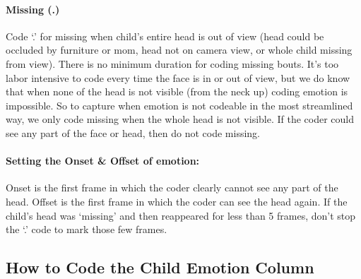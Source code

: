 \documentclass[
]{book}
\begin{document}
\hypertarget{child_head_not_visible}{%
\paragraph*{Missing (.)}\label{child_head_not_visible}}

Code `.' for missing when child's entire head is out of view (head could be occluded by furniture or mom, head not on camera view, or whole child missing from view). There is no minimum duration for coding missing bouts. It's too labor intensive to code every time the face is in or out of view, but we do know that when none of the head is not visible (from the neck up) coding emotion is impossible. So to capture when emotion is not codeable in the most streamlined way, we only code missing when the whole head is not visible. If the coder could see any part of the face or head, then do not code missing.

\hypertarget{setting-the-onset-offset-of-emotion-1}{%
\paragraph{Setting the Onset \& Offset of emotion:}\label{setting-the-onset-offset-of-emotion-1}}

Onset is the first frame in which the coder clearly cannot see any part of the head.
Offset is the first frame in which the coder can see the head again.
If the child's head was `missing' and then reappeared for less than 5 frames, don't stop the `.' code to mark those few frames.

\hypertarget{how-to-code-the-child-emotion-column}{%
\subsection*{How to Code the Child Emotion Column}\label{how-to-code-the-child-emotion-column}}
\end{document}
